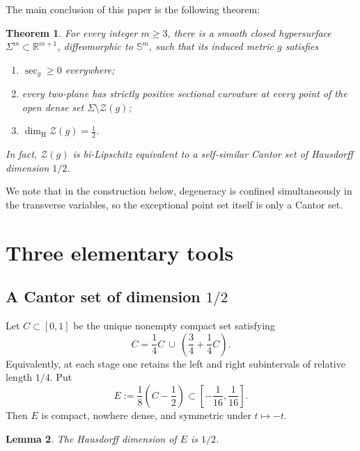 \documentclass[11pt]{amsart}
\newtheorem{theorem}{Theorem}[section]
\newtheorem{lemma}[theorem]{Lemma}
\theoremstyle{remark}
\newcommand{\R}{\mathbb R}
\newcommand{\Sph}{\mathbb S}
\newcommand{\Hd}{\dim_{\mathrm H}}
\newcommand{\secg}{\operatorname{sec}_g}
\begin{document}
The main conclusion of this paper is the following theorem:
\begin{theorem}\label{thm:main}
For every integer $m\geq3$, there is a smooth closed hypersurface
$\Sigma^m\subset\R^{m+1}$, diffeomorphic to $\Sph^m$, such that its induced metric $g$ satisfies
\begin{enumerate}[label=\textup{(\arabic*)},leftmargin=2.2em]
 \item $\secg\geq0$ everywhere;
 \item every two-plane has strictly positive sectional curvature at every point of the open dense set $\Sigma\setminus\mathcal Z(g)$;
 \item $\Hd\mathcal Z(g)=\tfrac12$.
\end{enumerate}
In fact, $\mathcal Z(g)$ is bi-Lipschitz equivalent to a self-similar Cantor set of Hausdorff dimension $1/2$.
\end{theorem}

We note that in the construction below, degeneracy is confined simultaneously in the transverse variables, so the exceptional point set itself is only a Cantor set.

\section{Three elementary tools}

\subsection{A Cantor set of dimension \texorpdfstring{$1/2$}{1/2}}

Let $C\subset[0,1]$ be the unique nonempty compact set satisfying
\begin{equation}\label{eq:cantor-ifs}
 C=\frac14 C\ \cup\ \left(\frac34+\frac14 C\right).
\end{equation}
Equivalently, at each stage one retains the left and right subintervals of relative length $1/4$.  Put
\begin{equation}\label{eq:E-definition}
 E:=\frac18\left(C-\frac12\right)\subset\left[-\frac1{16},\frac1{16}\right].
\end{equation}
Then $E$ is compact, nowhere dense, and symmetric under $t\mapsto-t$.

\begin{lemma}\label{lem:cantor-dimension}
The Hausdorff dimension of $E$ is $1/2$.
\end{lemma}
\end{document}
